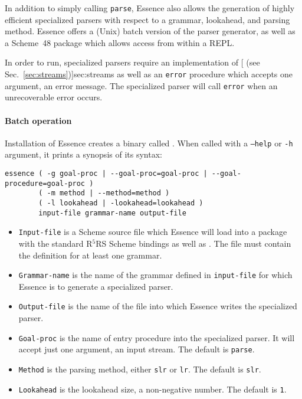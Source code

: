 \documentclass{article}
\newcommand{\codefont}[1]{\texttt{#1}}
\begin{document}
In addition to simply calling \codefont{parse}, Essence also allows
the generation of highly efficient specialized parsers with respect to
a grammar, lookahead, and parsing method.  Essence offers a (Unix)
batch version of the parser generator, as well as a Scheme~48 package
which allows access from within a REPL.

In order to run, specialized parsers require an implementation of
[ (see Sec.~\ref{sec:streams})]{sec:streams} as well as
an \codefont{error} procedure which accepts one argument, an error
message.  The specialized parser will call \codefont{error} when an
unrecoverable error occurs.

\paragraph{Batch operation}
Installation of Essence creates a binary called .
When called with a \codefont{--help} or \codefont{-h} argument, it
prints a synopsis of its syntax:
%
\begin{verbatim}
essence ( -g goal-proc | --goal-proc=goal-proc | --goal-procedure=goal-proc )
        ( -m method | --method=method )
        ( -l lookahead | -lookahead=lookahead )
        input-file grammar-name output-file
\end{verbatim}
%
\begin{itemize}
\item \texttt{Input-file} is a Scheme source file which Essence will
  load into a package with the standard R$^5$RS Scheme bindings as
  well as \link{\codefont{define-grammar}}{form:define-grammar}.  The
  file must contain the definition for at least one grammar.
\item \texttt{Grammar-name} is the name of the grammar defined in
  \texttt{input-file} for which Essence is to generate a specialized
  parser.
\item \texttt{Output-file} is the name of the file into which Essence
  writes the specialized parser.
\item \texttt{Goal-proc} is the name of entry procedure into the
  specialized parser.  It will accept just one argument, an input
  stream.  The default is \texttt{parse}.
\item \texttt{Method} is the parsing method, either \texttt{slr} or
  \texttt{lr}.  The default is \texttt{slr}.
\item \texttt{Lookahead} is the lookahead size, a non-negative
  number.  The default is \texttt{1}.
\end{itemize}
\end{document}
